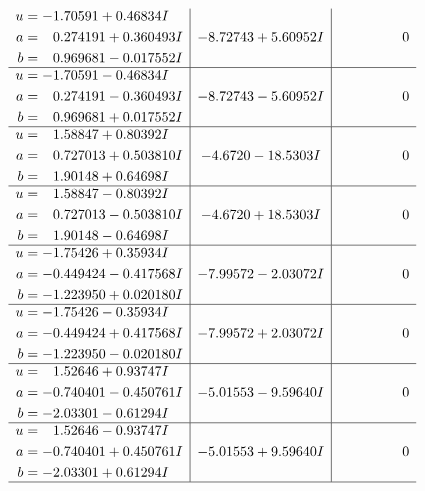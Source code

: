 \documentclass[1p]{elsarticle_modified}
\theoremstyle{definition}
\begin{document}
$$\begin{array}{c|c|c}
\begin{aligned}
u &= -1.70591 + 0.46834 I \\
a &= \phantom{-}0.274191 + 0.360493 I \\
b &= \phantom{-}0.969681 - 0.017552 I\end{aligned}
 & -8.72743 + 5.60952 I & \phantom{-0.000000 } 0 \\ \hline\begin{aligned}
u &= -1.70591 - 0.46834 I \\
a &= \phantom{-}0.274191 - 0.360493 I \\
b &= \phantom{-}0.969681 + 0.017552 I\end{aligned}
 & -8.72743 - 5.60952 I & \phantom{-0.000000 } 0 \\ \hline\begin{aligned}
u &= \phantom{-}1.58847 + 0.80392 I \\
a &= \phantom{-}0.727013 + 0.503810 I \\
b &= \phantom{-}1.90148 + 0.64698 I\end{aligned}
 & -4.6720 - 18.5303 I & \phantom{-0.000000 } 0 \\ \hline\begin{aligned}
u &= \phantom{-}1.58847 - 0.80392 I \\
a &= \phantom{-}0.727013 - 0.503810 I \\
b &= \phantom{-}1.90148 - 0.64698 I\end{aligned}
 & -4.6720 + 18.5303 I & \phantom{-0.000000 } 0 \\ \hline\begin{aligned}
u &= -1.75426 + 0.35934 I \\
a &= -0.449424 - 0.417568 I \\
b &= -1.223950 + 0.020180 I\end{aligned}
 & -7.99572 - 2.03072 I & \phantom{-0.000000 } 0 \\ \hline\begin{aligned}
u &= -1.75426 - 0.35934 I \\
a &= -0.449424 + 0.417568 I \\
b &= -1.223950 - 0.020180 I\end{aligned}
 & -7.99572 + 2.03072 I & \phantom{-0.000000 } 0 \\ \hline\begin{aligned}
u &= \phantom{-}1.52646 + 0.93747 I \\
a &= -0.740401 - 0.450761 I \\
b &= -2.03301 - 0.61294 I\end{aligned}
 & -5.01553 - 9.59640 I & \phantom{-0.000000 } 0 \\ \hline\begin{aligned}
u &= \phantom{-}1.52646 - 0.93747 I \\
a &= -0.740401 + 0.450761 I \\
b &= -2.03301 + 0.61294 I\end{aligned}
 & -5.01553 + 9.59640 I & \phantom{-0.000000 } 0\\
 \hline 
 \end{array}$$\newpage\newpage\renewcommand{\arraystretch}{1}
\end{document}
